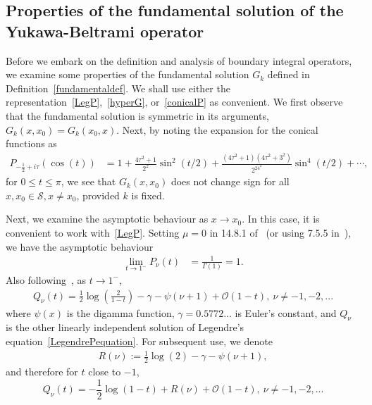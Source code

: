 \documentclass[final]{siamltex}
\renewcommand{\S} {\mathcal{S}}
\newcommand{\bigO} {\mathcal{O}}
\begin{document}
\subsection{Properties of the fundamental solution of the Yukawa-Beltrami operator}
Before we embark on the definition and analysis of boundary integral operators, we examine some properties of the fundamental solution $G_k$
defined in Definition~\ref{fundamentaldef}. We shall use either the
representation~\eqref{LegP},~\eqref{hyperG}, or~\eqref{conicalP} as
convenient. 
We first observe that the fundamental solution is symmetric in its arguments, $G_k(x,x_{0}) = G_k(x_{0},x)$. Next, by noting the expansion for the conical functions as~\cite{lebedev}
\begin{align*}
  P_{-\frac{1}{2}+i \tau} (\cos(t)) &= 1+
    \frac{4\tau^2+1}{2^2}\sin^2(t/2) + 
      \frac{(4\tau^2+1)(4\tau^2+3^2)}{2^24^2}\sin^4(t/2) + 
    \cdots,
\end{align*}
for $0\leq t\leq \pi$, we see that $G_k(x,x_0)$ does not change sign for
all $x,x_{0} \in \S, x \neq x_{0}$, provided $k$ is fixed.

Next, we examine the asymptotic behaviour as $x\rightarrow x_0$. In this
case, it is convenient to work with~\eqref{LegP}. Setting $\mu=0$ in
14.8.1 of~\cite{fatAbramowitz} (or using 7.5.5 in~\cite{lebedev}), we have the asymptotic behaviour
\begin{align} 
  \label{Pasymptotics}
  \lim_{t\rightarrow 1^- } P_\nu(t)&= \frac{1}{\Gamma(1)}=1.
\end{align}
Also following~\cite{fatAbramowitz}, as $t\rightarrow 1^{-}$,
\begin{align*}
  Q_{\nu}(t)=\frac{1}{2}\log\left(\frac{2}{1-t}\right)-\gamma
  -\psi(\nu+1)+\bigO(1-t),\: \nu \neq -1,-2,...
\end{align*} 
where $\psi(x)$ is the digamma function, $\gamma=0.5772\ldots$ is
Euler's constant, and $Q_{\nu}$ is the other linearly independent
solution of Legendre's equation~\eqref{LegendrePequation}.  For
subsequent use, we denote 
\begin{align*}
  R(\nu):= \frac{1}{2}\log(2) -\gamma -\psi(\nu+1), 
\end{align*}
and therefore for $t$ close to $-1$,
\begin{equation}
  \label{Qasymptotics}
  Q_{\nu}(t)=-\frac{1}{2}\log(1-t) + 
  R(\nu) + \bigO(1-t),\: \nu \neq -1,-2,... 
\end{equation}
\end{document}
